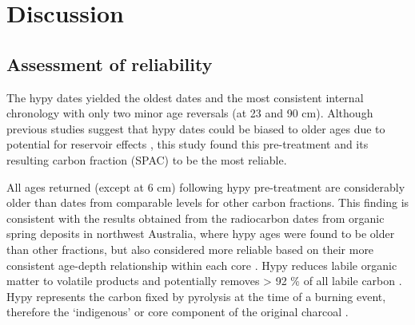 \documentclass[
  12pt,
]{book}
\begin{document}
\hypertarget{discussion}{%
\section{Discussion}\label{discussion}}

\hypertarget{assessment-of-reliability}{%
\subsection{Assessment of reliability}\label{assessment-of-reliability}}

The hypy dates yielded the oldest dates and the most consistent internal chronology with only two minor age reversals (at 23 and 90 cm). Although previous studies suggest that hypy dates could be biased to older ages due to potential for reservoir effects \citep{fieldUntanglingGeochronologicalComplexity2018}, this study found this pre-treatment and its resulting carbon fraction (SPAC) to be the most reliable.

All ages returned (except at 6 cm) following hypy pre-treatment are considerably older than dates from comparable levels for other carbon fractions. This finding is consistent with the results obtained from the radiocarbon dates from organic spring deposits in northwest Australia, where hypy ages were found to be older than other fractions, but also considered more reliable based on their more consistent age-depth relationship within each core \citep{fieldUntanglingGeochronologicalComplexity2018}. Hypy reduces labile organic matter to volatile products \citep{ascoughHydropyrolysisNewTool2009} and potentially removes \textgreater{} 92 \% of all labile carbon \citep{birdEfficiencyCharcoalDecontamination2014}. Hypy represents the carbon fixed by pyrolysis at the time of a burning event, therefore the `indigenous' or core component of the original charcoal \citep{ascoughHydropyrolysisNewTool2009, ascoughHydropyrolysisImplicationsRadiocarbon2010}.
\end{document}
